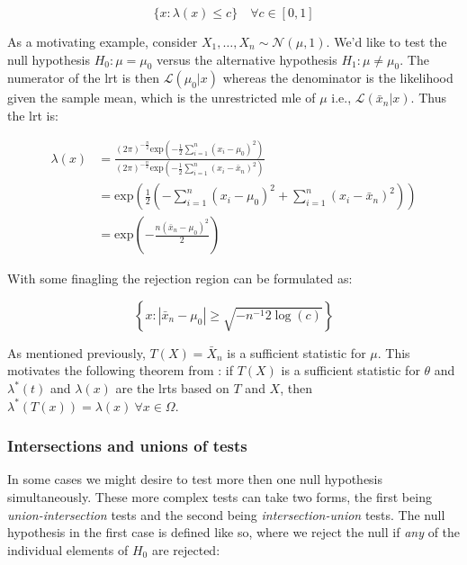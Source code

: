 \documentclass{report}
\begin{document}
\begin{equation}\label{eq:lrt-rejection-region}
    \{x \colon \lambda(x) \leq c\} \quad \forall c \in [0, 1]
\end{equation}

As a motivating example, consider $X_1, \dots, X_n \sim \mathcal{N}(\mu, 1)$. We'd like to test the null hypothesis $H_0 \colon \mu = \mu_0$ versus the alternative hypothesis $H_1 \colon \mu \neq \mu_0$. The numerator of the \gls{lrt} is then $\mathcal{L}(\mu_0|x)$ whereas the denominator is the likelihood given the sample mean, which is the unrestricted \gls{mle} of $\mu$ i.e., $\mathcal{L}(\bar{x}_n|x)$. Thus the \gls{lrt} is:

\begin{equation}\label{eq:lrt-normal-rvs}
    \begin{aligned}
        \lambda(x) 
          &= \frac{(2\pi)^{-\frac{n}{2}} \text{exp}\left(-\frac{1}{2} \sum_{i=1}^n (x_i - \mu_0)^2\right)}{(2\pi)^{-\frac{n}{2}} \text{exp}\left(-\frac{1}{2} \sum_{i=1}^n (x_i - \bar{x}_n)^2\right)} \\
          &= \text{exp}\left(\frac{1}{2} \left(-\sum_{i=1}^n (x_i - \mu_0)^2 + \sum_{i=1}^n (x_i - \bar{x}_n)^2\right)\right) \\
          &= \text{exp}\left(-\frac{n(\bar{x}_n - \mu_0)^2}{2}\right)
    \end{aligned}
\end{equation}

With some finagling the rejection region can be formulated as:

\begin{equation}\label{eq:lrt-normal-rvs-rejection-region}
    \left\{x \colon |\bar{x}_n - \mu_0| \geq \sqrt{-n^{-1}2\log(c)}\right\}
\end{equation}

As mentioned previously, $T(X) = \bar{X}_n$ is a sufficient statistic for $\mu$. This motivates the following theorem from \cite[Chapter~8.2.1]{casella_statistical_2002}: if $T(X)$ is a sufficient statistic for $\theta$ and $\lambda^*(t)$ and $\lambda(x)$ are the \glspl{lrt} based on $T$ and $X$, then $\lambda^*(T(x)) = \lambda(x) \: \forall x \in \Omega$. 

\subsubsection{Intersections and unions of tests}

In some cases we might desire to test more then one null hypothesis simultaneously. These more complex tests can take two forms, the first being \textit{union-intersection} tests and the second being \textit{intersection-union} tests. The null hypothesis in the first case is defined like so, where we reject the null if \textit{any} of the individual elements of $H_0$ are rejected:
\end{document}
